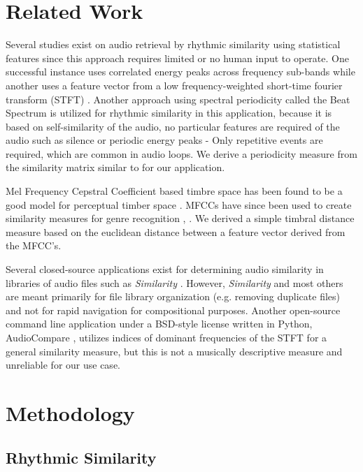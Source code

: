 \documentclass{article}
\begin{document}
\section{Related Work}

Several studies exist on audio retrieval by rhythmic similarity using statistical features since this approach requires limited or no human input to operate. One successful instance uses correlated energy peaks across frequency sub-bands \cite{scheirer1998tempo}  while another uses a feature vector from a low frequency-weighted short-time fourier transform (STFT) \cite{wold1999classification}. Another approach using spectral periodicity called the Beat Spectrum \cite{foote2001beat} is utilized for rhythmic similarity in this application, because it is based on self-similarity of the audio, no particular features are required of the audio such as silence or periodic energy peaks - Only repetitive events are required, which are common in audio loops. We derive a periodicity measure from the similarity matrix similar to \cite{foote2001beat} for our application.

Mel Frequency Cepstral Coefficient based timbre space has been found to be a good model for perceptual timber space \cite{terasawa2005thirteen}. MFCCs have since been used to create similarity measures \cite{jensen2009quantitative} for genre recognition \cite{levy2006lightweight}, \cite{jensen2006evaluation}. We derived a simple timbral distance measure based on the euclidean distance between a feature vector derived from the MFCC's.

Several closed-source applications exist for determining audio similarity in libraries of audio files such as \textit{Similarity} \cite{similarityapp}. However, \textit{Similarity} and most others are meant primarily for file library organization (e.g. removing duplicate files) and not for rapid navigation for compositional purposes. Another open-source command line application under a BSD-style license written in Python, AudioCompare \cite{audiocompare}, utilizes indices of dominant frequencies of the STFT for a general similarity measure, but this is not a musically descriptive measure and unreliable for our use case. 


\section{Methodology}

\subsection{Rhythmic Similarity}
\end{document}
